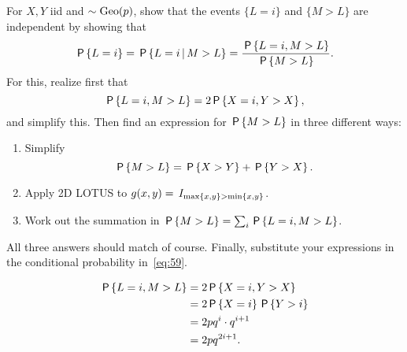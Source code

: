 \documentclass[a4paper,11pt]{article}
\renewcommand{\max}[1]{\mathrm{max}\{#1\}}
\renewcommand{\min}[1]{\mathrm{min}\{#1\}}
\begin{document}
\begin{exercise}\label{ex:10}
For  $X, Y$ iid and $\sim \Geo{p}$, show that the events $\{L=i\}$ and $\{M>L\}$ are independent by showing that
\begin{equation}
  \label{eq:59}
\P{L=i} = \P{L=i \given M>L} =  \frac{\P{L=i, M > L}}{\P{M>L}}.
\end{equation}
For this, realize first that
\begin{equation}
  \label{eq:62}
\P{L=i,  M > L} = 2\P{X=i,Y > X},
\end{equation}
and simplify this. Then find an expression for $\P{M>L}$ in three different ways:
\begin{enumerate}
\item Simplify
  \begin{equation}
    \label{eq:61}
\P{M>L}  = \P{X>Y} + \P{Y > X}.
  \end{equation}
\item Apply  2D LOTUS to $g(x,y) = \1{\max{x,y}>\min{x,y}}$.
\item Work out the summation in $\P{M>L} = \sum_{i} \P{L=i, M>L}$.
\end{enumerate}
All three answers should match of course. Finally, substitute your expressions in the conditional probability in~\cref{eq:59}.
\begin{solution}
\begin{align}
\P{L=i,  M > L}
&= 2\P{X=i,Y > X} \\
&= 2\P{X=i}\P{Y > i} \\
&= 2pq^i\cdot q^{i+1}\\
&= 2p q^{2i+1}.
\end{align}


\end{solution}
\end{exercise}
\end{document}
